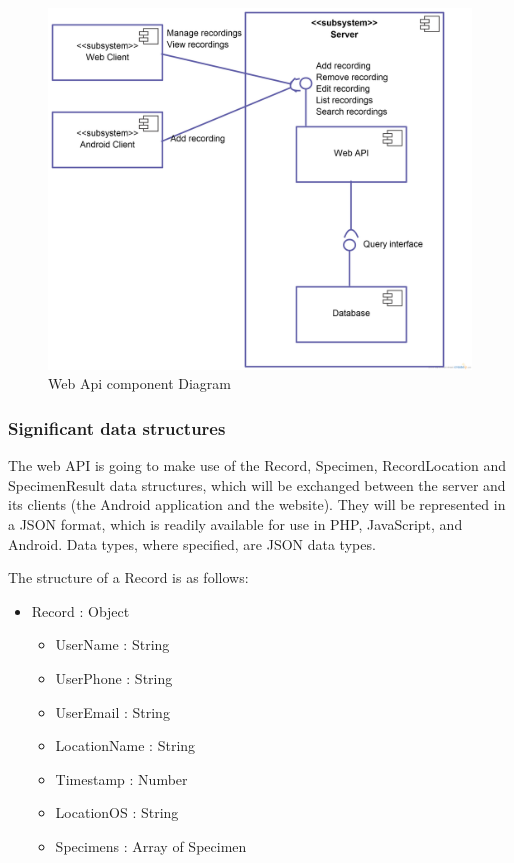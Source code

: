         \begin{landscape}
            \begin{figure}
                \centering
                \includegraphics[scale=0.2]{server/ComponentDiagram.png}
                \caption{Web Api component Diagram}
                \label{fig:webAPIComponentDiagram}
            \end{figure}
        \end{landscape}

    \subsubsection{Significant data structures}

        The web API is going to make use of the Record, Specimen, RecordLocation and SpecimenResult data structures, which will be exchanged between the server and its clients (the Android application and the website). They will be represented in a JSON format, which is readily available for use in PHP, JavaScript, and Android. Data types, where specified, are JSON data types. 

        The structure of a Record is as follows:
        \begin{itemize}
            \item Record : Object
            \begin{itemize}
                \item UserName : String
                \item UserPhone : String
                \item UserEmail : String
                \item LocationName : String 
                \item Timestamp : Number 
                \item LocationOS : String
                \item Specimens : Array of Specimen
            \end{itemize}
        \end{itemize}
        
